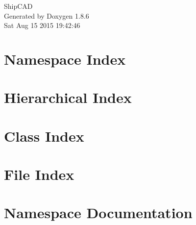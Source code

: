 \documentclass[twoside]{book}
\newcommand{\clearemptydoublepage}{%
  \newpage{\pagestyle{empty}\cleardoublepage}%
}
\begin{document}
\hypersetup{pageanchor=false}
\begin{titlepage}
\vspace*{7cm}
\begin{center}%
{\Large Ship\-C\-A\-D }\\
\vspace*{1cm}
{\large Generated by Doxygen 1.8.6}\\
\vspace*{0.5cm}
{\small Sat Aug 15 2015 19:42:46}\\
\end{center}
\end{titlepage}
\clearemptydoublepage
\tableofcontents
\clearemptydoublepage
{}
\hypersetup{pageanchor=true}

\chapter{Namespace Index}

\chapter{Hierarchical Index}

\chapter{Class Index}

\chapter{File Index}

\chapter{Namespace Documentation}


\end{document}
